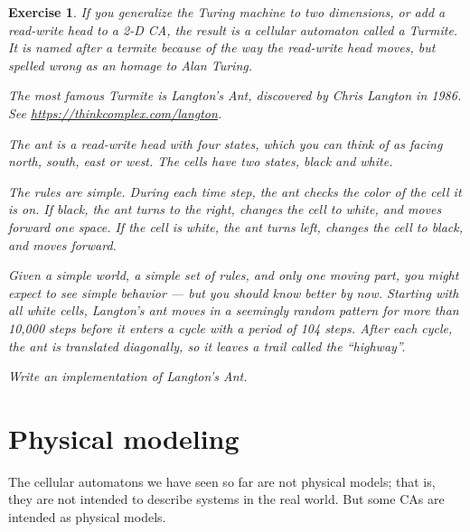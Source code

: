 \documentclass[12pt]{book}
\theoremstyle{exercise}
\newtheorem{exercise}{Exercise}[chapter]
\begin{document}
\begin{exercise}

If you generalize the Turing machine to two dimensions, or
add a read-write head to a 2-D CA, the result is a
cellular automaton called a Turmite.  It is named after a
termite because of the way the read-write head moves, but
spelled wrong as an homage to Alan Turing.


The most famous Turmite is Langton's Ant, discovered by Chris Langton
in 1986.  See \url{https://thinkcomplex.com/langton}.


The ant is a read-write head with
four states, which you can think of as facing north, south,
east or west.  The cells have two states, black and white.


The rules are simple.  During each time step, the ant checks the color
of the cell it is on.  If black, the ant turns to the right,
changes the cell to white, and moves forward one space.  If the cell
is white, the ant turns left, changes the cell to black, and moves
forward.


Given a simple world, a simple set of rules, and only one moving part,
you might expect to see simple behavior --- but you should know
better by now.  Starting with all white cells, Langton's ant
moves in a seemingly random pattern for more than 10,000 steps
before it enters a cycle with a period of 104 steps.  After
each cycle, the ant is translated diagonally, so it leaves
a trail called the ``highway''.


Write an implementation of Langton's Ant.

\end{exercise}




\chapter{Physical modeling}
\label{modeling}

The cellular automatons we have seen so far are not physical models;
that is, they are not intended to describe systems in the real world.
But some CAs are intended as physical models.
\end{document}
